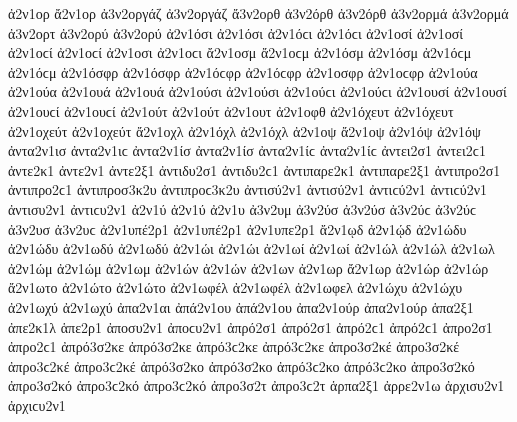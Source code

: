 {ἀ2ν1ορ
ἄ2ν1ορ   %
ἀ3ν2οργάζ ἀ3ν2οργάζ   %
ἄ3ν2ορθ   %
ἀ3ν2όρθ ἀ3ν2όρθ
ἀ3ν2ορμά ἀ3ν2ορμά   %
ἀ3ν2ορτ   %
ἀ3ν2ορύ ἀ3ν2ορύ   %
ἀ2ν1όσι ἀ2ν1όσι ἀ2ν1όϲι ἀ2ν1όϲι   %
ἀ2ν1οσί ἀ2ν1οσί ἀ2ν1οϲί ἀ2ν1οϲί
ἀ2ν1οσι ἀ2ν1οϲι   %
ἄ2ν1οσμ ἄ2ν1οϲμ   %
ἀ2ν1όσμ ἀ2ν1όσμ ἀ2ν1όϲμ ἀ2ν1όϲμ
ἀ2ν1όσφρ ἀ2ν1όσφρ ἀ2ν1όϲφρ ἀ2ν1όϲφρ   %
ἀ2ν1οσφρ ἀ2ν1οϲφρ
ἀ2ν1ούα ἀ2ν1ούα   %
ἀ2ν1ουά ἀ2ν1ουά
ἀ2ν1ούσι ἀ2ν1ούσι ἀ2ν1ούϲι ἀ2ν1ούϲι   %
ἀ2ν1ουσί ἀ2ν1ουσί ἀ2ν1ουϲί ἀ2ν1ουϲί
ἀ2ν1ούτ ἀ2ν1ούτ   %
ἀ2ν1ουτ
ἀ2ν1οφθ   %
ἀ2ν1όχευτ ἀ2ν1όχευτ   %
ἀ2ν1οχεύτ ἀ2ν1οχεύτ
ἄ2ν1οχλ   %
ἀ2ν1όχλ ἀ2ν1όχλ
ἀ2ν1οψ   %
ἄ2ν1οψ   %
ἀ2ν1όψ ἀ2ν1όψ
ἀντα2ν1ισ ἀντα2ν1ιϲ   %
ἀντα2ν1ίσ ἀντα2ν1ίσ ἀντα2ν1ίϲ ἀντα2ν1ίϲ   %
ἀντει2σ1 ἀντει2ϲ1   %
ἀντε2κ1   %
ἀντε2ν1   %
ἀντε2ξ1   %
ἀντιδυ2σ1 ἀντιδυ2ϲ1   %
ἀντιπαρε2κ1   %
ἀντιπαρε2ξ1   %
ἀντιπρο2σ1 ἀντιπρο2ϲ1   %
ἀντιπροσ3κ2υ ἀντιπροϲ3κ2υ   %
ἀντισύ2ν1 ἀντισύ2ν1 ἀντιϲύ2ν1 ἀντιϲύ2ν1   %
ἀντισυ2ν1 ἀντιϲυ2ν1
ἀ2ν1ύ ἀ2ν1ύ   %
ἀ2ν1υ
ἀ3ν2υμ   %
ἀ3ν2ύσ ἀ3ν2ύσ ἀ3ν2ύϲ ἀ3ν2ύϲ   %
ἀ3ν2υσ ἀ3ν2υϲ   %
ἀ2ν1υπέ2ρ1 ἀ2ν1υπέ2ρ1   %
ἀ2ν1υπε2ρ1
ἄ2ν1ῳδ   %
ἀ2ν1ῴδ
ἀ2ν1ώδυ ἀ2ν1ώδυ   %
ἀ2ν1ωδύ ἀ2ν1ωδύ   %
ἀ2ν1ώι ἀ2ν1ώι   %
ἀ2ν1ωί ἀ2ν1ωί
ἀ2ν1ώλ ἀ2ν1ώλ   %
ἀ2ν1ωλ
ἀ2ν1ώμ ἀ2ν1ώμ   %
ἀ2ν1ωμ
ἀ2ν1ών ἀ2ν1ών   %
ἀ2ν1ων
ἀ2ν1ωρ   %
ἄ2ν1ωρ   %
ἀ2ν1ώρ ἀ2ν1ώρ
ἄ2ν1ωτο   %
ἀ2ν1ώτο ἀ2ν1ώτο
ἀ2ν1ωφέλ ἀ2ν1ωφέλ   %
ἀ2ν1ωφελ   %
ἀ2ν1ώχυ ἀ2ν1ώχυ   %
ἀ2ν1ωχύ ἀ2ν1ωχύ
ἀπα2ν1αι   %
ἀπά2ν1ου ἀπά2ν1ου   %
ἀπα2ν1ούρ ἀπα2ν1ούρ
ἁπα2ξ1   %
ἀπε2κ1λ   %
ἁπε2ρ1   %
ἀποσυ2ν1 ἀποϲυ2ν1   %
ἀπρό2σ1 ἀπρό2σ1 ἀπρό2ϲ1 ἀπρό2ϲ1   %
ἀπρο2σ1 ἀπρο2ϲ1
ἀπρό3σ2κε ἀπρό3σ2κε ἀπρό3ϲ2κε ἀπρό3ϲ2κε   %
ἀπρο3σ2κέ ἀπρο3σ2κέ ἀπρο3ϲ2κέ ἀπρο3ϲ2κέ
ἀπρό3σ2κο ἀπρό3σ2κο ἀπρό3ϲ2κο ἀπρό3ϲ2κο   %
ἀπρο3σ2κό ἀπρο3σ2κό ἀπρο3ϲ2κό ἀπρο3ϲ2κό
ἀπρο3σ2τ ἀπρο3ϲ2τ   %
ἁρπα2ξ1   %
ἀρρε2ν1ω   %
ἀρχισυ2ν1 ἀρχιϲυ2ν1   %
}
